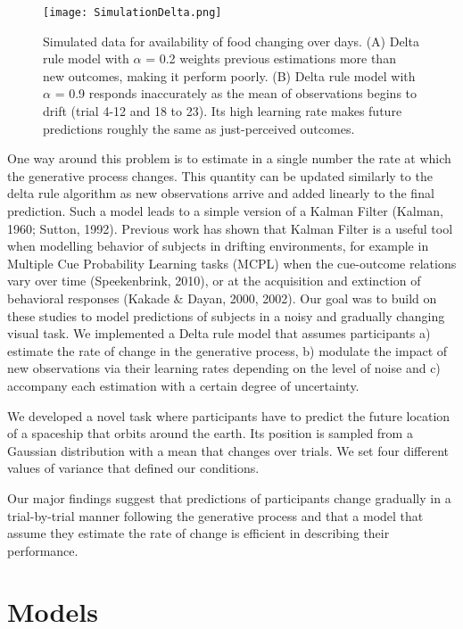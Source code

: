 \documentclass[jou,apacite]{apa6}
\begin{document}
\begin{figure}[!ht]
\centering
\texttt{[image: SimulationDelta.png]}
\caption{Simulated data for availability of food changing over days. (A) Delta rule model with $\alpha$ = 0.2 weights previous estimations more than new outcomes, making it perform poorly. (B) Delta rule model with $\alpha$ = 0.9 responds inaccurately as the mean of observations begins to drift (trial 4-12 and 18 to 23). Its high learning rate makes future predictions roughly the same as just-perceived outcomes.}
\label{fig:hiperpro}
\end{figure}

One way around this problem is to estimate in a single number the rate at which the generative process changes. This quantity can be updated similarly to the delta rule algorithm as new observations arrive and added linearly to the final prediction. Such a model leads to a simple version of a Kalman Filter (Kalman, 1960; Sutton, 1992). Previous work has shown that Kalman Filter is a useful tool when modelling behavior of subjects in drifting environments, for example in Multiple Cue Probability Learning tasks (MCPL) when the cue-outcome relations vary over time (Speekenbrink, 2010), or at the acquisition and extinction of behavioral responses (Kakade \& Dayan, 2000, 2002). Our goal was to build on these studies to model predictions of subjects in a noisy and gradually changing visual task. We implemented a Delta rule model that assumes participants a) estimate the rate of change in the generative process, b) modulate the impact of new observations via their learning rates depending on the level of noise and c) accompany each estimation with a certain degree of uncertainty. 

We developed a novel task where participants have to predict the future location of a spaceship that orbits around the earth. Its position is sampled from a Gaussian distribution with a mean that changes over trials. We set four different values of variance that defined our conditions. 

Our major findings suggest that predictions of participants change gradually in a trial-by-trial manner following the generative process and that a model that assume they estimate the rate of change is efficient in describing their performance. 


\section{Models}
\end{document}

